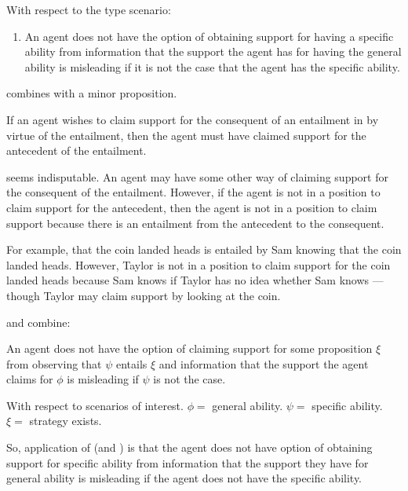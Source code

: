 \begin{note}
  With respect to the type scenario:

  \begin{enumerate}[label=\nI{}, ref=\nI{}]
  \item An agent does not have the option of obtaining support for having a specific ability from information that the support the agent has for having the general ability is misleading if it is not the case that the agent has the specific ability.
  \end{enumerate}

  \nI{} combines with a minor proposition.

  \begin{proposition}[\nIm{}]
    If an agent wishes to claim support for the consequent of an entailment in by virtue of the entailment, then the agent must have claimed support for the antecedent of the entailment.
  \end{proposition}
  \nIm{} seems indisputable.
  An agent may have some other way of claiming support for the consequent of the entailment.
  However, if the agent is not in a position to claim support for the antecedent, then the agent is not in a position to claim support because there is an entailment from the antecedent to the consequent.

  For example, that the coin landed heads is entailed by Sam knowing that the coin landed heads.
  However, Taylor is not in a position to claim support for the coin landed heads because Sam knows if Taylor has no idea whether Sam knows --- though Taylor may claim support by looking at the coin.

  \nI{} and \nIm{} combine:

  \begin{proposition}[\nIp{}]
    An agent does not have the option of claiming support for some proposition \(\xi\) from observing that \(\psi\) entails \(\xi\) and information that the support the agent claims for \(\phi\) is misleading if \(\psi\) is not the case.
  \end{proposition}

  With respect to scenarios of interest.
    \(\phi = \) general ability.
    \(\psi = \) specific ability.
    \(\xi = \) strategy exists.

    So, application of \nI{} (and \nIm{}) is that the agent does not have option of obtaining support for specific ability from information that the support they have for general ability is misleading if the agent does not have the specific ability.


\end{note}
